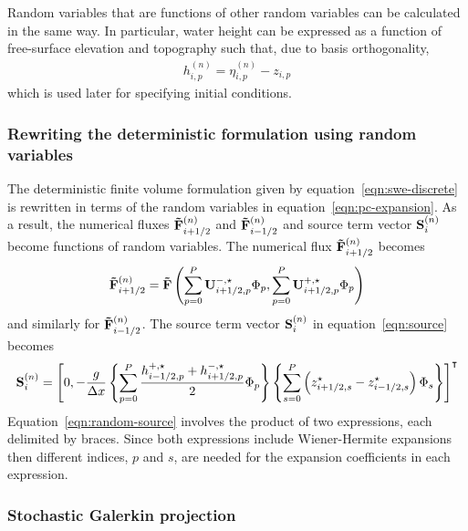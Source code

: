 Random variables that are functions of other random variables can be calculated in the same way.
In particular, water height can be expressed as a function of free-surface elevation and topography such that, due to basis orthogonality,
\begin{align}
h_{i,p}^{(n)} = \eta_{i,p}^{(n)} - z_{i,p}
\label{eqn:h-eta-z}
\end{align}
which is used later for specifying initial conditions.

\subsubsection*{Rewriting the deterministic formulation using random variables}

The deterministic finite volume formulation given by equation~\eqref{eqn:swe-discrete} is rewritten in terms of the random variables in equation~\eqref{eqn:pc-expansion}.
As a result, the numerical fluxes $\mathbf{\tilde{F}}_{i+1/2}^{(n)}$ and $\mathbf{\tilde{F}}_{i-1/2}^{(n)}$ and source term vector $\mathbf{S}_i^{(n)}$ become functions of random variables.
The numerical flux $\mathbf{\tilde{F}}_{i+1/2}^{(n)}$ becomes
\begin{align}
	\mathbf{\tilde{F}}_{i+1/2}^{(n)} = \mathbf{\tilde{F}} \left(
	\sum_{p=0}^P \mathbf{U}^{-,\star}_{i+1/2,p} \Phi_p, 
	\sum_{p=0}^P \mathbf{U}^{+,\star}_{i+1/2,p} \Phi_p
	\right)
\end{align}
and similarly for $\mathbf{\tilde{F}}_{i-1/2}^{(n)}$.
The source term vector $\mathbf{S}_i^{(n)}$ in equation~\eqref{eqn:source} becomes
\begin{align}
	\mathbf{S}_i^{(n)} = \left[ 0, -\frac{g}{\Delta x}
	\left\{
	\sum_{p=0}^P \frac{h^{+,\star}_{i-1/2,p} + h^{-,\star}_{i+1/2,p}}{2} \Phi_p \right\}
\left\{ \sum_{s=0}^P \left( z^\star_{i+1/2,s} - z^\star_{i-1/2,s} \right) \Phi_s \right\}
	\right]^\intercal
	\label{eqn:random-source}
\end{align}
Equation~\eqref{eqn:random-source} involves the product of two expressions, each delimited by braces.
Since both expressions include Wiener-Hermite expansions then different indices, $p$ and $s$, are needed for the expansion coefficients in each expression.

\subsubsection*{Stochastic Galerkin projection}

